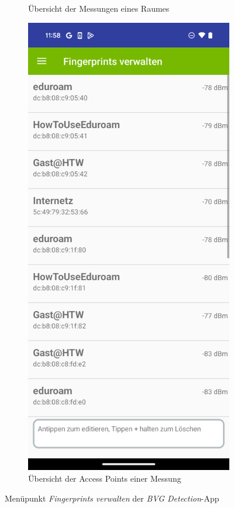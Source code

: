 \begin{figure}[h!]
\begin{subfigure}[b]{0.3\textwidth}
        \caption{Übersicht der Messungen eines Raumes}
        \label{fig:bild2}
    \end{subfigure}
    \hfill
    \begin{subfigure}[b]{0.3\textwidth}
        \centering
        \includegraphics[width=\textwidth]{images/screenshots/fingerprint.png}
        \caption{Übersicht der Access Points einer Messung}
        \label{fig:bild3}
    \end{subfigure}
    \caption{Menüpunkt \textit{Fingerprints verwalten} der \textit{BVG Detection}-App}
    \label{fig:fingerprints-verwalten}
\end{figure}


